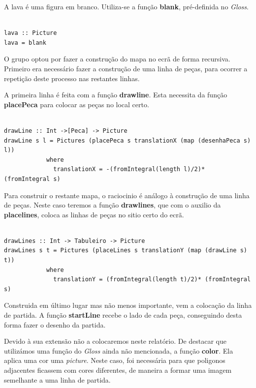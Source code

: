 \documentclass[a4paper]{report} %
\begin{document}
\normalsize

A lava é uma figura em branco. Utiliza-se a função \textbf{blank}, pré-definida no \textit{Gloss}.

\begin{verbatim}

lava :: Picture
lava = blank

\end{verbatim}

O grupo optou por fazer a construção do mapa no ecrã de forma recursiva.
Primeiro era necessário fazer a construção de uma linha de peças, para ocorrer a repetição deste processo nas restantes linhas.

A primeira linha é feita com a função \textbf{drawline}. Esta necessita da função \textbf{placePeca} para colocar as peças no local certo.

\begin{verbatim}

drawLine :: Int ->[Peca] -> Picture
drawLine s l = Pictures (placePeca s translationX (map (desenhaPeca s) l))
            where
              translationX = -(fromIntegral(length l)/2)* (fromIntegral s)

\end{verbatim}

\newpage

Para construir o restante mapa, o raciocinio é análogo à construção de uma linha de peças.
Neste caso teremos a função \textbf{drawlines}, que com o auxilio da \textbf{placelines}, coloca as linhas de peças no sitio certo do ecrã.

\begin{verbatim}

drawLines :: Int -> Tabuleiro -> Picture
drawLines s t = Pictures (placeLines s translationY (map (drawLine s) t))
            where
              translationY = (fromIntegral(length t)/2)* (fromIntegral s)

\end{verbatim}

Construida em último lugar mas não menos importante, vem a colocação da linha de partida. A função \textbf{startLine} recebe o lado de cada peça, conseguindo desta forma fazer o desenho da partida.

Devido à sua extensão não a colocaremos neste relatório. De destacar que utilizámos uma função do \textit{Gloss} ainda não mencionada, a função \textbf{color}. Ela aplica uma cor uma \emph{picture}. Neste caso, foi necessária para que poligonos adjacentes ficassem com cores diferentes, de maneira a formar uma imagem semelhante a uma linha de partida.
\end{document}
